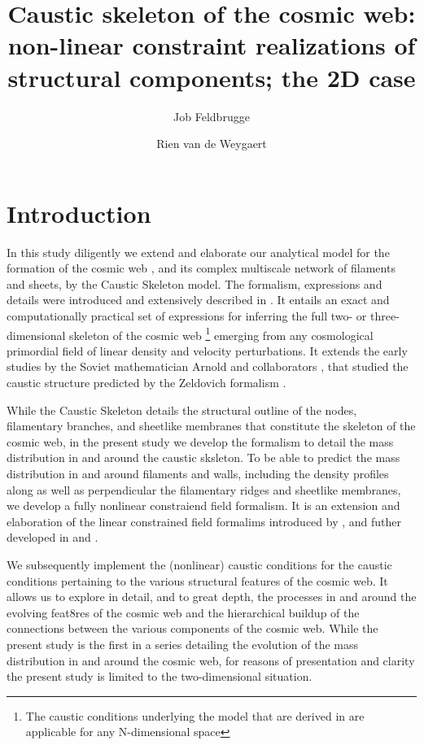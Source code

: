 \documentclass[a4paper, 11pt]{article}
\title{Caustic skeleton of the cosmic web: non-linear constraint realizations of structural components; the 2D case}
\author[a,b]{Job Feldbrugge}
\author[c]{Rien van de Weygaert}
\affiliation[a]{Higgs Centre for Theoretical Physics, University of Edinburgh, Edinburgh, Scotland, EH8 9YL}
\affiliation[b]{Physics department, Carnegie Mellon University, Pittsburgh, United States}
\affiliation[c]{Kapteyn Astronomical Institute, University of Groningen, Groningen, The Netherlands}
\begin{document}
\maketitle

\newpage
\section{Introduction}
In this study diligently we extend and elaborate our analytical model for the
formation of the cosmic web \citep{zeldovich1970,bond1996,weybond2008},
and its complex
multiscale network of filaments and sheets, by the Caustic Skeleton
model\citet{feldbrugge2019}. The formalism, expressions and details were
introduced
and extensively described in \citet{feldbrugge2019}. It entails an exact
and computationally practical set of expressions for inferring the  full
two- or three-dimensional skeleton of the cosmic web \footnote{The
caustic conditions underlying the model that are derived in
\citep{feldbrugge2019} are
   applicable for any N-dimensional space} emerging from any
cosmological primordial field of linear density and velocity
perturbations. It extends the early
studies by the Soviet mathematician Arnold and collaborators
\citep{arnold1982}, that studied the caustic structure predicted by the
Zeldovich formalism
\citep{zeldovich1970}.

While the Caustic Skeleton details the structural outline of the nodes,
filamentary branches, and sheetlike membranes that constitute the
skeleton of the
cosmic web, in the present study we develop the formalism to detail the
mass distribution in and around the caustic sksleton. To be able to
predict the mass distribution in and around filaments and walls,
including the density profiles along as well as perpendicular the
filamentary ridges
and sheetlike membranes, we develop a fully nonlinear constraiend field
formalism. It is an extension and elaboration of the linear constrained
field formalims
introduced by \cite{bertschinger1987}, and futher developed in
\citet{hofrib1991} and \citet{weyedb1996}.

We subsequently implement the (nonlinear) caustic conditions for the
caustic conditions pertaining to the various structural features of the
cosmic web.
It allows us to explore in detail, and to great depth, the processes in
and around the evolving feat8res of the cosmic web and the hierarchical
buildup of the
connections between the various components of the cosmic web. While the
present study is the first in a series detailing the evolution of
the mass distribution in and around the cosmic web, for reasons of
presentation and clarity the present study is limited to the
two-dimensional situation.
\end{document}
